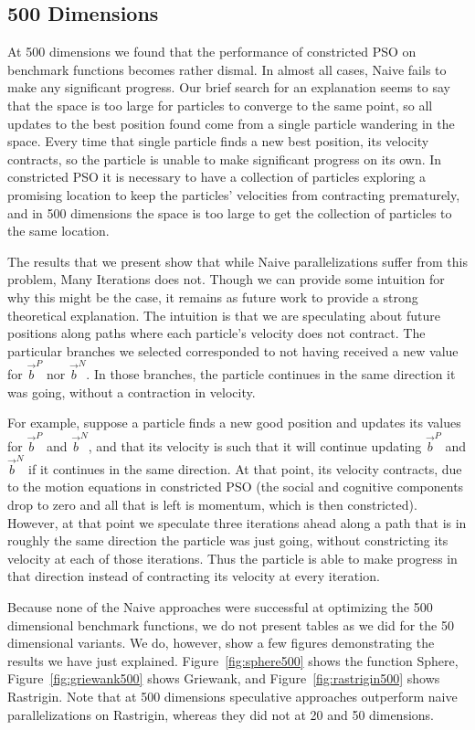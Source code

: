 \documentclass[smallcondensed]{svjour3}
\newcommand{\fig}[1]{Figure~\ref{fig:#1}}
\providecommand{\pers}{\ensuremath{P}}
\providecommand{\neigh}{\ensuremath{N}}
\providecommand{\nbest}{\ensuremath{\Vec{b}^\neigh}}
\providecommand{\pbest}{\ensuremath{\Vec{b}^\pers}}
\begin{document}
\subsection{500 Dimensions}
\label{sec:500dims}

At 500 dimensions we found that the performance of constricted PSO on benchmark
functions becomes rather dismal.  In almost all cases, Naive fails to make
any significant progress.  Our brief search for an explanation seems to say
that the space is too large for particles to converge to the same point, so all
updates to the best position found come from a single particle wandering in the
space.  Every time that single particle finds a new best position, its velocity
contracts, so the particle is unable to make significant progress on its own.
In constricted PSO it is necessary to have a collection of particles exploring
a promising location to keep the particles' velocities from contracting
prematurely, and in 500 dimensions the space is too large to get the collection
of particles to the same location.

The results that we present show that while Naive parallelizations suffer
from this problem, Many Iterations does not.  Though we can provide some
intuition for why this might be the case, it remains as future work to provide
a strong theoretical explanation.  The intuition is that we are speculating
about future positions along paths where each particle's velocity does not
contract.  The particular branches we selected corresponded to not having
received a new value for $\pbest$ nor $\nbest$.  In those branches, the
particle continues in the same direction it was going, without a contraction in
velocity.

For example, suppose a particle finds a new good position and updates its
values for $\pbest$ and $\nbest$, and that its velocity is such that it will
continue updating $\pbest$ and $\nbest$ if it continues in the same direction.
At that point, its velocity contracts, due to the motion equations in
constricted PSO (the social and cognitive components drop to zero and all that
is left is momentum, which is then constricted).  However, at that point we
speculate three iterations ahead along a path that is in roughly the same
direction the particle was just going, without constricting its velocity at
each of those iterations.  Thus the particle is able to make progress in that
direction instead of contracting its velocity at every iteration.

Because none of the Naive approaches were successful at optimizing the 500
dimensional benchmark functions, we do not present tables as we did for the 50
dimensional variants.  We do, however, show a few figures demonstrating the
results we have just explained.  \fig{sphere500} shows the function Sphere,
\fig{griewank500} shows Griewank, and \fig{rastrigin500} shows Rastrigin.  Note
that at 500 dimensions speculative approaches outperform naive
parallelizations on Rastrigin, whereas they did not at 20 and 50 dimensions.
\end{document}
